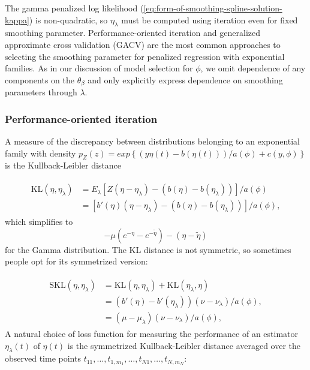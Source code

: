 The gamma penalized log likelihood (\ref{eq:form-of-smoothing-spline-solution-kappa}) is non-quadratic, so $\eta_\lambda$ must be computed using iteration even for fixed smoothing parameter. Performance-oriented iteration and generalized approximate cross validation (GACV) are the most common approaches to selecting the smoothing parameter for penalized regression with exponential families. As in our discussion of model selection for $\phi$, we omit dependence of any components on the $\theta_\beta$ and only explicitly express dependence on smoothing parameters through $\lambda$.

\subsubsection{Performance-oriented iteration} 

A measure of the discrepancy between distributions belonging to an exponential family with density $p_Z\left(z\right) = exp\left\{\left(y \eta\left(t\right) - b\left(\eta\left(t\right)\right)\right)/a\left(\phi\right) + c\left(y,\phi\right) \right\}$ is the Kullback-Leibler distance

\begin{align}
\begin{split} \label{eq:kl-distance-definition}
\mbox{KL}\left(\eta, \eta_\lambda\right) &= E_\lambda\left[Z \left(\eta - \eta_\lambda \right) - \left(b\left(\eta\right)- b\left(\eta_\lambda\right) \right)\right]/a\left(\phi\right)\\
&=\left[ b'\left(\eta\right) \left(\eta - \eta_\lambda \right) - \left(b\left(\eta\right)- b\left(\eta_\lambda\right) \right)\right]/a\left(\phi\right),
\end{split}
\end{align}
\noindent
which simplifies to
\[
-\mu\left( e^{-\eta} - e^{-\tilde{\eta}}\right) - \left(\eta-\tilde{\eta}\right)
\]
\noindent
for the Gamma distribution. The KL distance is not symmetric, so sometimes people opt for its symmetrized version:

\begin{align}
\begin{split} \label{eq:skl-distance-definition}
\mbox{SKL}\left(\eta, \eta_\lambda\right) &= \mbox{KL}\left(\eta, \eta_\lambda\right) + \mbox{KL}\left(\eta_\lambda, \eta \right)\\
&= \left(b'\left(\eta\right) - b'\left(\eta_\lambda\right) \right)\left( \nu - \nu_\lambda\right)/a\left(\phi\right), \\
&= \left(\mu - \mu_\lambda \right)\left( \nu - \nu_\lambda\right)/a\left(\phi\right),
\end{split}
\end{align}
\noindent
A natural choice of loss function for measuring the performance of an estimator $\eta_\lambda\left(t\right)$ of $\eta \left(t\right)$ is the symmetrized Kullback-Leibler distance averaged over the observed time points $t_{11}, \dots , t_{1,m_1},\dots,t_{N1}, \dots , t_{N,m_N}$:

